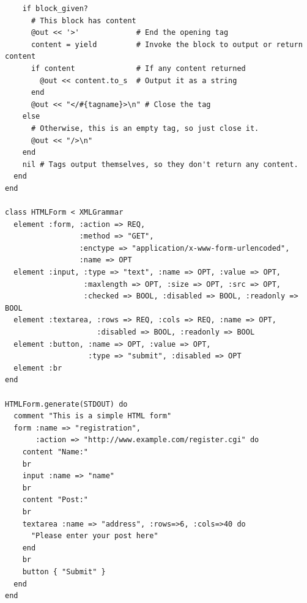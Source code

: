 \begin{latexonly}
\begin{lstlisting}
    if block_given?
      # This block has content
      @out << '>'             # End the opening tag
      content = yield         # Invoke the block to output or return content
      if content              # If any content returned
        @out << content.to_s  # Output it as a string
      end
      @out << "</#{tagname}>\n" # Close the tag
    else 
      # Otherwise, this is an empty tag, so just close it.
      @out << "/>\n"
    end
    nil # Tags output themselves, so they don't return any content.
  end
end

class HTMLForm < XMLGrammar
  element :form, :action => REQ,
                 :method => "GET",
                 :enctype => "application/x-www-form-urlencoded",
                 :name => OPT
  element :input, :type => "text", :name => OPT, :value => OPT,
                  :maxlength => OPT, :size => OPT, :src => OPT,
                  :checked => BOOL, :disabled => BOOL, :readonly => BOOL
  element :textarea, :rows => REQ, :cols => REQ, :name => OPT,
                     :disabled => BOOL, :readonly => BOOL
  element :button, :name => OPT, :value => OPT,
                   :type => "submit", :disabled => OPT
  element :br
end

HTMLForm.generate(STDOUT) do
  comment "This is a simple HTML form"
  form :name => "registration",
       :action => "http://www.example.com/register.cgi" do
    content "Name:"
    br
    input :name => "name"
    br
    content "Post:"
    br
    textarea :name => "address", :rows=>6, :cols=>40 do
      "Please enter your post here"
    end
    br
    button { "Submit" }
  end
end

    \end{lstlisting}
  \end{latexonly}
